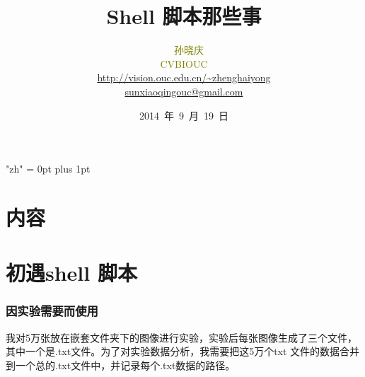 \documentclass[notheorems,mathserif,table,compress,10pt]{beamer}  %
\begin{document}
\XeTeXlinebreaklocale "zh"         %
\XeTeXlinebreakskip = 0pt plus 1pt %


\title{Shell 脚本那些事}
\author[CVBIOUC]{~~\textcolor{olive}{孙晓庆 }\\
    \quad \textcolor{olive}{CVBIOUC}\\
    \textcolor{blue}{\url{http://vision.ouc.edu.cn/~zhenghaiyong}
    \\
    \href{mailto:sunxiaoqingouc@gmail.com}{sunxiaoqingouc@gmail.com}}
    }
\date{2014~年~9~月~19~日}
\frame{ \titlepage }
\section*{内容}

\section{初遇shell 脚本 }

\begin{frame}
\frametitle{因实验需要而使用}
\begin{tcolorbox}[colback=blue!5,colframe=blue!75!black]

 我对5万张放在嵌套文件夹下的图像进行实验，实验后每张图像生成了三个文件，其中一个是.txt文件。为了对实验数据分析，我需要把这5万个txt 文件的数据合并到一个总的.txt文件中，并记录每个.txt数据的路径。
\end{tcolorbox}

\end{frame}  
\end{document}
